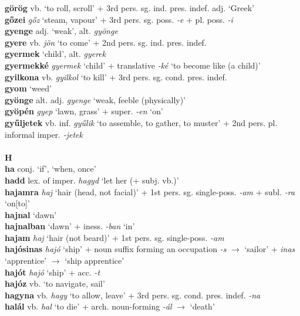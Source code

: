 \documentclass[11pt]{article}
\begin{document}
\textbf{görög} vb. `to roll, scroll' + 3rd
pers. sg. ind. pres. indef. \textbar\textbar{} adj. `Greek' \\
\textbf{gőzei} \emph{gőz} `steam, vapour' + 3rd
pers. sg. poss. \emph{-e} + pl. poss. \emph{-i} \\
\textbf{gyenge} adj. `weak', alt. \emph{gyönge} \\
\textbf{gyere} vb. \emph{jön} `to come' + 2nd
pers. sg. ind. pres. indef. \\
\textbf{gyermek} `child', alt. \emph{gyerek} \\
\textbf{gyermekké} \emph{gyermek} `child' + translative \emph{-ké}
`to become like (a child)' \\
\textbf{gyilkona} vb. \emph{gyilkol} `to kill' + 3rd
pers. sg. cond. pres. indef. \\
\textbf{gyom} `weed' \\
\textbf{gyönge} alt. adj. \emph{gyenge} `weak, feeble (physically)' \\
\textbf{gyöpén} \emph{gyep} `lawn, grass' + super. \emph{-en} `on' \\
\textbf{gyűljetek} vb. inf. \emph{gyűlik} `to assemble, to gather, to muster' + 2nd
pers. pl. informal imper. \emph{-jetek} \\
\ \\
\noindent \textbf{\large H} \\
\textbf{ha} conj. `if', `when, once' \\
\textbf{hadd} lex. of imper. \emph{hagyd} `let her (+ subj. vb.)' \\
\textbf{hajamra} \emph{haj} `hair (head, not facial)' + 1st
pers. sg. single\hyp{}poss. \emph{-am} + subl. \emph{-ra} `on[to]' \\
\textbf{hajnal} `dawn' \\
\textbf{hajnalban} `dawn' + iness. \emph{-ban} `in' \\
\textbf{hajam} \emph{haj} `hair (not beard)' + 1st
pers. sg. single\hyp{}poss. \emph{-am} \\
\textbf{hajósinas} \emph{hajó} `ship' + noun suffix forming an
occupation \emph{-s} $\rightarrow$ `sailor' + \emph{inas} `apprentice'
$\rightarrow$ `ship apprentice' \\
\textbf{hajót} \emph{hajó} `ship' + acc. \emph{-t} \\
\textbf{hajóz} vb. `to navigate, sail' \\
\textbf{hagyna} vb. \emph{hagy} `to allow, leave' + 3rd
pers. sg. cond. pres. indef. \emph{-na} \\
\textbf{halál} vb. \emph{hal} `to die' + arch. noun\hyp{}forming \emph{-ál} $\rightarrow$ `death' \\
\end{document}
